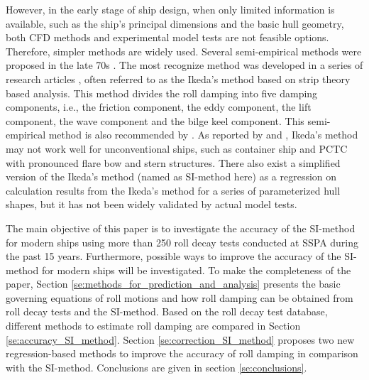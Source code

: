 However, in the early stage of ship design, when only limited information is available, such as the ship's principal dimensions and the basic hull geometry, both CFD methods and experimental model tests are not feasible options. Therefore, simpler methods are widely used. 
Several semi-empirical methods were proposed in the late 70s \parencite{himeno_prediction_1981}. The most recognize method was developed in a series of research articles \parencite{ikeda_roll_1978,ikeda_eddy_1978,ikeda_roll_1979,ikeda_components_1978,ikeda_velocity_1979}, often referred to as the Ikeda's method based on strip theory based analysis. This method divides the roll damping into five damping components, i.e., the friction component, the eddy component, the lift component, the wave component and the bilge keel component. This semi-empirical method is also recommended by \parencite{ittc_ittc_2011}. As reported by  \parencite{kawahara_simple_2011} and \parencite{soder_ikeda_2019}, Ikeda's method may not work well for unconventional ships, such as container ship and PCTC with pronounced flare bow and stern structures. 
There also exist a simplified version of the Ikeda's method (named as SI-method here) \parencite{kawahara_simple_2011} as a regression on calculation results from the Ikeda's method for a series of parameterized hull shapes, but it has not been widely validated by actual model tests. 

The main objective of this paper is to investigate the accuracy of the SI-method for modern ships using more than 250 roll decay tests conducted at SSPA during the past 15 years. Furthermore, possible ways to improve the accuracy of the SI-method for modern ships will be investigated.
To make the completeness of the paper, Section \ref{se:methods_for_prediction_and_analysis} presents the basic governing equations of roll motions and how roll damping can be obtained from roll decay tests and the SI-method. 
Based on the roll decay test database, different methods to estimate roll damping are compared in Section \ref{se:accuracy_SI_method}. Section \ref{se:correction_SI_method} proposes two new regression-based methods to improve the accuracy of roll damping in comparison with the SI-method. Conclusions are given in section \ref{se:conclusions}.  
